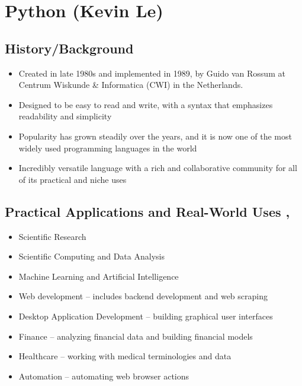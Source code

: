 \section{Python (Kevin Le)}

\subsection{History/Background}
\begin{itemize}
	\item Created in late 1980s and implemented in 1989, by Guido van Rossum at Centrum Wiskunde \& Informatica (CWI) in the Netherlands. \cite{python_institute_about_nodate}
	\item Designed to be easy to read and write, with a syntax that emphasizes readability and simplicity
	\item Popularity has grown steadily over the years, and it is now one of the most widely used programming languages in the world
	\item Incredibly versatile language with a rich and collaborative community for all of its practical and niche uses
\end{itemize}

\subsection{Practical Applications and Real-World Uses \cite{python_software_foundation_applications_nodate}, \cite{rohit_sharma_top_2022}}
\begin{itemize}
	\item Scientific Research
	\item Scientific Computing and Data Analysis
	\item Machine Learning and Artificial Intelligence
	\item Web development -- includes backend development and web scraping
	\item Desktop Application Development -- building graphical user interfaces 
	\item Finance -- analyzing financial data and building financial models
	\item Healthcare -- working with medical terminologies and data
	
	\item Automation -- automating web browser actions
\end{itemize}

